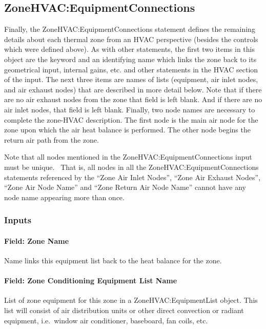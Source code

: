 \subsection{ZoneHVAC:EquipmentConnections}\label{zonehvacequipmentconnections}

Finally, the ZoneHVAC:EquipmentConnections statement defines the remaining details about each thermal zone from an HVAC perspective (besides the controls which were defined above). As with other statements, the first two items in this object are the keyword and an identifying name which links the zone back to its geometrical input, internal gains, etc. and other statements in the HVAC section of the input. The next three items are names of lists (equipment, air inlet nodes, and air exhaust nodes) that are described in more detail below. Note that if there are no air exhaust nodes from the zone that field is left blank. And if there are no air inlet nodes, that field is left blank. Finally, two node names are necessary to complete the zone-HVAC description. The first node is the main air node for the zone upon which the air heat balance is performed. The other node begins the return air path from the zone.

Note that all nodes mentioned in the ZoneHVAC:EquipmentConnections input must be unique.~ That is, all nodes in all the ZoneHVAC:EquipmentConnections statements referenced by the ``Zone Air Inlet Nodes'', ``Zone Air Exhaust Nodes'', ``Zone Air Node Name'' and ``Zone Return Air Node Name'' cannot have any node name appearing more than once.

\subsubsection{Inputs}\label{inputs-1-052}

\paragraph{Field: Zone Name}\label{field-zone-name-015}

Name links this equipment list back to the heat balance for the zone.

\paragraph{Field: Zone Conditioning Equipment List Name}\label{field-zone-conditioning-equipment-list-name}

List of zone equipment for this zone in a ZoneHVAC:EquipmentList object. This list will consist of air distribution units or other direct convection or radiant equipment, i.e.~window air conditioner, baseboard, fan coils, etc.

